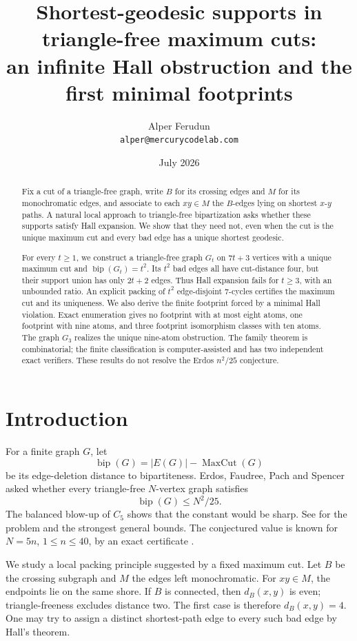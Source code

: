 \documentclass[11pt]{article}
\title{Shortest-geodesic supports in triangle-free maximum cuts:\\
an infinite Hall obstruction and the first minimal footprints}
\author{Alper Ferudun\\\texttt{alper@mercurycodelab.com}}
\date{July 2026}
\theoremstyle{definition}
\newcommand{\bip}{\operatorname{bip}}
\newcommand{\mc}{\operatorname{MaxCut}}
\begin{document}
\maketitle

\begin{abstract}
Fix a cut of a triangle-free graph, write \(B\) for its crossing edges and
\(M\) for its monochromatic edges, and associate to each \(xy\in M\) the
\(B\)-edges lying on shortest \(x\)-\(y\) paths. A natural local approach
to triangle-free bipartization asks whether these supports satisfy Hall
expansion. We show that they need not, even when the cut is the unique
maximum cut and every bad edge has a unique shortest geodesic.

For every \(t\ge1\), we construct a triangle-free graph \(G_t\) on
\(7t+3\) vertices with a unique maximum cut and \(\bip(G_t)=t^2\).
Its \(t^2\) bad edges all have cut-distance four, but their support union
has only \(2t+2\) edges. Thus Hall expansion fails for \(t\ge3\), with an
unbounded ratio. An explicit packing of \(t^2\) edge-disjoint \(7\)-cycles
certifies the maximum cut and its uniqueness. We also derive the finite
footprint forced by a minimal Hall violation. Exact enumeration gives no
footprint with at most eight atoms, one footprint with nine atoms, and
three footprint isomorphism classes with ten atoms. The graph \(G_3\)
realizes the unique nine-atom obstruction. The family theorem is
combinatorial; the finite classification is computer-assisted and has two
independent exact verifiers. These results do not resolve the Erdos
\(n^2/25\) conjecture.
\end{abstract}

\section{Introduction}

For a finite graph \(G\), let
\[
 \bip(G)=|E(G)|-\mc(G)
\]
be its edge-deletion distance to bipartiteness. Erdos, Faudree, Pach and
Spencer asked whether every triangle-free \(N\)-vertex graph satisfies
\[
 \bip(G)\le N^2/25. \tag{1}\label{eq:erdos}
\]
The balanced blow-up of \(C_5\) shows that the constant would be sharp.
See \cite{EFPS88,EGS92,BCL21} for the problem and the strongest general
bounds. The conjectured value is known for \(N=5n\), \(1\le n\le40\),
by an exact certificate \cite{Ferudun26}.

We study a local packing principle suggested by a fixed maximum cut.
Let \(B\) be the crossing subgraph and \(M\) the edges left monochromatic.
For \(xy\in M\), the endpoints lie on the same shore. If \(B\) is
connected, then \(d_B(x,y)\) is even; triangle-freeness excludes distance
two. The first case is therefore \(d_B(x,y)=4\). One may try to assign a
distinct shortest-path edge to every such bad edge by Hall's theorem.
\end{document}
